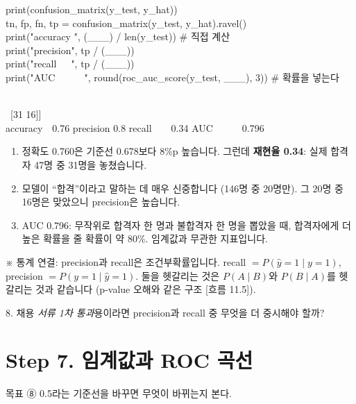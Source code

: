 \documentclass[11pt,a4paper]{article}
\newcommand{\aside}[1]{{\footnotesize\color{black!65}#1}}
\begin{document}
\begin{codebox}
print(confusion\_matrix(y\_test, y\_hat))\\
tn, fp, fn, tp = confusion\_matrix(y\_test, y\_hat).ravel()\\
print("accuracy ", (\_\_\_) / len(y\_test)) \hfill \# 직접 계산\\
print("precision", tp / (\_\_\_))\\
print("recall\ \ \ ", tp / (\_\_\_))\\
print("AUC\ \ \ \ \ \ ", round(roc\_auc\_score(y\_test, \_\_\_), 3)) \hfill \# 확률을 넣는다
\end{codebox}
\begin{outbox}
[[95\ \ 4]\\
\ [31 16]]\\
accuracy\ \ 0.76 \quad precision 0.8 \quad recall\ \ \ \ 0.34 \quad AUC\ \ \ \ \ \ 0.796
\end{outbox}

\begin{howbox}
\begin{enumerate}
\item 정확도 0.760은 기준선 0.678보다 8\%p 높습니다. 그런데 \textbf{재현율 0.34}: 실제 합격자 47명 중 31명을 놓쳤습니다.
\item 모델이 ``합격''이라고 말하는 데 매우 신중합니다 (146명 중 20명만). 그 20명 중 16명은 맞았으니 precision은 높습니다.
\item AUC 0.796: 무작위로 합격자 한 명과 불합격자 한 명을 뽑았을 때, 합격자에게 더 높은 확률을 줄 확률이 약 80\%. 임계값과 무관한 지표입니다.
\end{enumerate}
\end{howbox}
\aside{※ 통계 연결: precision과 recall은 조건부확률입니다. recall $=P(\hat y=1\mid y=1)$, precision $=P(y=1\mid\hat y=1)$. 둘을 헷갈리는 것은 $P(A\mid B)$와 $P(B\mid A)$를 헷갈리는 것과 같습니다 (p-value 오해와 같은 구조 [흐름 11.5]).}

\begin{qbox}
8. 채용 \emph{서류 1차 통과}용이라면 precision과 recall 중 무엇을 더 중시해야 할까?
\end{qbox}

\section{Step 7. 임계값과 ROC 곡선}
\begin{goalbox}{목표 \quad ⑧}
0.5라는 기준선을 바꾸면 무엇이 바뀌는지 본다.
\end{goalbox}
\end{document}
